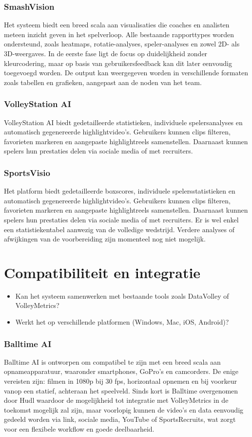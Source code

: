 \subsubsection{SmashVision}
Het systeem biedt een breed scala aan visualisaties die coaches en analisten meteen inzicht geven in het spelverloop. Alle bestaande rapporttypes worden ondersteund, zoals heatmaps, rotatie-analyses, speler-analyses en zowel 2D- als 3D-weergaves. In de eerste fase ligt de focus op duidelijkheid zonder kleurcodering, maar op basis van gebruikersfeedback kan dit later eenvoudig toegevoegd worden. De output kan weergegeven worden in verschillende formaten zoals tabellen en grafieken, aangepast aan de noden van het team. \autocite{Doren2025}
\subsubsection{VolleyStation AI}
VolleyStation AI biedt gedetailleerde statistieken, individuele spelersanalyses en automatisch gegenereerde highlightvideo's. Gebruikers kunnen clips filteren, favorieten markeren en aangepaste highlightreels samenstellen. Daarnaast kunnen spelers hun prestaties delen via sociale media of met recruiters. \autocite{VolleyStationAI2025}
\subsubsection{SportsVisio}
Het platform biedt gedetailleerde boxscores, individuele spelersstatistieken en automatisch gegenereerde highlightvideo's. Gebruikers kunnen clips filteren, favorieten markeren en aangepaste highlightreels samenstellen. Daarnaast kunnen spelers hun prestaties delen via sociale media of met recruiters.\autocite{SportsVisio2025} Er is wel enkel een statistiekentabel aanwezig van de volledige wedstrijd. Verdere analyses of afwijkingen van de voorbereiding zijn momenteel nog niet mogelijk. \autocite{Basaranlar2025}

\section{Compatibiliteit en integratie}
\begin{itemize}
  \item Kan het systeem samenwerken met bestaande tools zoals DataVolley of VolleyMetrics?
  \item Werkt het op verschillende platformen (Windows, Mac, iOS, Android)?
\end{itemize}
\subsubsection{Balltime AI}
Balltime AI is ontworpen om compatibel te zijn met een breed scala aan opnameapparatuur, waaronder smartphones, GoPro’s en camcorders. De enige vereisten zijn: filmen in 1080p bij 30 fps, horizontaal opnemen en bij voorkeur vanop een statief, achteraan het speelveld. Sinds kort is Balltime overgenomen door Hudl waardoor de mogelijkheid tot integratie met VolleyMetrics in de toekomst mogelijk zal zijn, maar voorlopig kunnen de video's en data eenvoudig gedeeld worden via link, sociale media, YouTube of SportsRecruits, wat zorgt voor een flexibele workflow en goede deelbaarheid. \autocite{BalltimeAI2025}
